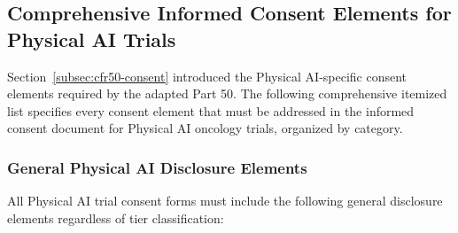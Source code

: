 \subsection{Comprehensive Informed Consent Elements for Physical AI Trials}
\label{subsec:cfr50-consent-comprehensive}

Section~\ref{subsec:cfr50-consent} introduced the Physical AI-specific consent
elements required by the adapted Part 50. The following comprehensive itemized
list specifies every consent element that must be addressed in the informed
consent document for Physical AI oncology trials, organized by category.

\subsubsection{General Physical AI Disclosure Elements}

All Physical AI trial consent forms must include the following general
disclosure elements regardless of tier classification:

